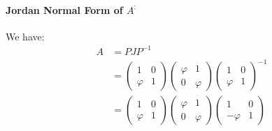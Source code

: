 \documentclass[]{article}
\begin{document}
\paragraph{Jordan Normal Form of $A^: $} We have: 
\begin{align*}
	A&=PJP^{-1} \\
	&=
	\begin{pmatrix}
		1 & 0 \\ \varphi & 1
	\end{pmatrix} \begin{pmatrix}
		\varphi & 1 \\ 0 & \varphi
	\end{pmatrix}\begin{pmatrix}
		1 & 0 \\ \varphi & 1
	\end{pmatrix}^{-1} \\
&=\begin{pmatrix}
	1 & 0 \\ \varphi & 1
\end{pmatrix} \begin{pmatrix}
	\varphi & 1 \\ 0 & \varphi
\end{pmatrix}\begin{pmatrix}
	1 & 0 \\ -\varphi & 1
\end{pmatrix}
\end{align*}
\end{document}
